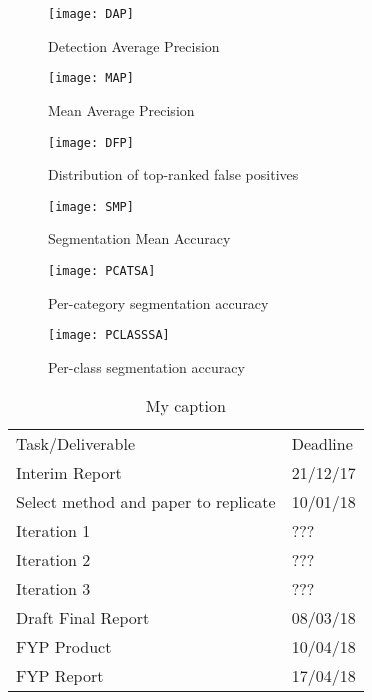 \begin{figure}
    \texttt{[image: DAP]}
    \caption{Detection Average Precision \textcite{donahue}}
    \label{fig:dap}
\end{figure}

\begin{figure}
    \texttt{[image: MAP]}
    \caption{Mean Average Precision \textcite{donahue}}
    \label{fig:MAP}
\end{figure}

\begin{figure}
    \texttt{[image: DFP]}
    \caption{Distribution of top-ranked false positives
    \textcite{donahue}}
    \label{fig:DFP}
\end{figure}

\begin{figure}
    \texttt{[image: SMP]}
    \caption{Segmentation Mean Accuracy \textcite{donahue}}
    \label{fig:SMP}
\end{figure}

\begin{figure}
    \texttt{[image: PCATSA]}
    \caption{Per-category segmentation accuracy \textcite{donahue}}
    \label{fig:PCATSA}
\end{figure}

\begin{figure}
    \texttt{[image: PCLASSSA]}
    \caption{Per-class segmentation accuracy \textcite{donahue}}
    \label{fig:PCLASSA}
\end{figure}

\begin{table}[]
    \centering
    \caption{My caption}
    \label{my-label}
    \begin{tabular}{ll}
        Task/Deliverable                     & Deadline \\
        Interim Report                       & 21/12/17 \\
        Select method and paper to replicate & 10/01/18 \\
        Iteration 1                          & ???      \\
        Iteration 2                          & ???      \\
        Iteration 3                          & ???      \\
        Draft Final Report                   & 08/03/18 \\
        FYP Product                          & 10/04/18 \\
        FYP Report                           & 17/04/18
    \end{tabular}
\end{table}
